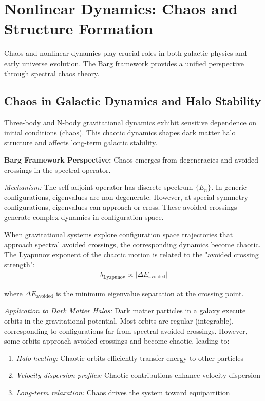 \documentclass[12pt,a4paper]{article}
\begin{document}
\section{Nonlinear Dynamics: Chaos and Structure Formation}

Chaos and nonlinear dynamics play crucial roles in both galactic physics and early universe evolution. The Barg framework provides a unified perspective through spectral chaos theory.

\subsection{Chaos in Galactic Dynamics and Halo Stability}

Three-body and N-body gravitational dynamics exhibit sensitive dependence on initial conditions (chaos). This chaotic dynamics shapes dark matter halo structure and affects long-term galactic stability.

\textbf{Barg Framework Perspective:} Chaos emerges from degeneracies and avoided crossings in the spectral operator.

\textit{Mechanism:} The self-adjoint operator has discrete spectrum $\{E_n\}$. In generic configurations, eigenvalues are non-degenerate. However, at special symmetry configurations, eigenvalues can approach or cross. These avoided crossings generate complex dynamics in configuration space.

When gravitational systems explore configuration space trajectories that approach spectral avoided crossings, the corresponding dynamics become chaotic. The Lyapunov exponent of the chaotic motion is related to the "avoided crossing strength":
\begin{align}
\lambda_{\text{Lyapunov}} \propto |\Delta E_{\text{avoided}}|
\end{align}

where $\Delta E_{\text{avoided}}$ is the minimum eigenvalue separation at the crossing point.

\textit{Application to Dark Matter Halos:} Dark matter particles in a galaxy execute orbits in the gravitational potential. Most orbits are regular (integrable), corresponding to configurations far from spectral avoided crossings. However, some orbits approach avoided crossings and become chaotic, leading to:

\begin{enumerate}
\item \textit{Halo heating:} Chaotic orbits efficiently transfer energy to other particles
\item \textit{Velocity dispersion profiles:} Chaotic contributions enhance velocity dispersion
\item \textit{Long-term relaxation:} Chaos drives the system toward equipartition
\end{enumerate}
\end{document}
